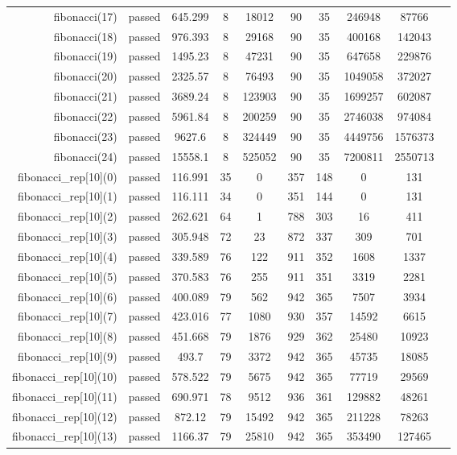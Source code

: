 \begin{longtable}{r|ccccccccc}
    fibonacci(17) & passed & 645.299 & 8 & 18012 & 90 & 35 & 246948 & 87766 \\
    fibonacci(18) & passed & 976.393 & 8 & 29168 & 90 & 35 & 400168 & 142043 \\
    fibonacci(19) & passed & 1495.23 & 8 & 47231 & 90 & 35 & 647658 & 229876 \\
    fibonacci(20) & passed & 2325.57 & 8 & 76493 & 90 & 35 & 1049058 & 372027 \\
    fibonacci(21) & passed & 3689.24 & 8 & 123903 & 90 & 35 & 1699257 & 602087 \\
    fibonacci(22) & passed & 5961.84 & 8 & 200259 & 90 & 35 & 2746038 & 974084 \\
    fibonacci(23) & passed & 9627.6 & 8 & 324449 & 90 & 35 & 4449756 & 1576373 \\
    fibonacci(24) & passed & 15558.1 & 8 & 525052 & 90 & 35 & 7200811 & 2550713 \\
    fibonacci\_rep[10](0) & passed & 116.991 & 35 & 0 & 357 & 148 & 0 & 131 \\
    fibonacci\_rep[10](1) & passed & 116.111 & 34 & 0 & 351 & 144 & 0 & 131 \\
    fibonacci\_rep[10](2) & passed & 262.621 & 64 & 1 & 788 & 303 & 16 & 411 \\
    fibonacci\_rep[10](3) & passed & 305.948 & 72 & 23 & 872 & 337 & 309 & 701 \\
    fibonacci\_rep[10](4) & passed & 339.589 & 76 & 122 & 911 & 352 & 1608 & 1337 \\
    fibonacci\_rep[10](5) & passed & 370.583 & 76 & 255 & 911 & 351 & 3319 & 2281 \\
    fibonacci\_rep[10](6) & passed & 400.089 & 79 & 562 & 942 & 365 & 7507 & 3934 \\
    fibonacci\_rep[10](7) & passed & 423.016 & 77 & 1080 & 930 & 357 & 14592 & 6615 \\
    fibonacci\_rep[10](8) & passed & 451.668 & 79 & 1876 & 929 & 362 & 25480 & 10923 \\
    fibonacci\_rep[10](9) & passed & 493.7 & 79 & 3372 & 942 & 365 & 45735 & 18085 \\
    fibonacci\_rep[10](10) & passed & 578.522 & 79 & 5675 & 942 & 365 & 77719 & 29569 \\
    fibonacci\_rep[10](11) & passed & 690.971 & 78 & 9512 & 936 & 361 & 129882 & 48261 \\
    fibonacci\_rep[10](12) & passed & 872.12 & 79 & 15492 & 942 & 365 & 211228 & 78263 \\
    fibonacci\_rep[10](13) & passed & 1166.37 & 79 & 25810 & 942 & 365 & 353490 & 127465 \\

\end{longtable}
